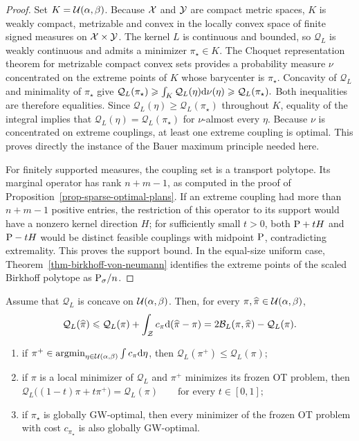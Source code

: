\begin{proof}
Set $K=\Couplings(\alpha,\beta)$. Because $\X$ and $\Y$ are compact metric spaces, $K$ is weakly compact, metrizable and convex in the locally convex space of finite signed measures on $\X\times\Y$. The kernel $L$ is continuous and bounded, so $\mathcal Q_L$ is weakly continuous and admits a minimizer $\pi_\star\in K$. The Choquet representation theorem for metrizable compact convex sets provides a probability measure $\nu$ concentrated on the extreme points of $K$ whose barycenter is $\pi_\star$. Concavity of $\mathcal Q_L$ and minimality of $\pi_\star$ give
\(\mathcal Q_L(\pi_\star) \geq \int_K\mathcal Q_L(\eta)\d\nu(\eta) \geq \mathcal Q_L(\pi_\star).\)
Both inequalities are therefore equalities. Since $\mathcal Q_L(\eta)\geq\mathcal Q_L(\pi_\star)$ throughout $K$, equality of the integral implies that $\mathcal Q_L(\eta)=\mathcal Q_L(\pi_\star)$ for $\nu$-almost every $\eta$. Because $\nu$ is concentrated on extreme couplings, at least one extreme coupling is optimal. This proves directly the instance of the Bauer maximum principle needed here.

For finitely supported measures, the coupling set is a transport polytope. Its marginal operator has rank $n+m-1$, as computed in the proof of Proposition~\ref{prop-sparse-optimal-plans}. If an extreme coupling had more than $n+m-1$ positive entries, the restriction of this operator to its support would have a nonzero kernel direction $H$; for sufficiently small $t>0$, both $\P+tH$ and $\P-tH$ would be distinct feasible couplings with midpoint $\P$, contradicting extremality. This proves the support bound. In the equal-size uniform case, Theorem~\ref{thm-birkhoff-von-neumann} identifies the extreme points of the scaled Birkhoff polytope as $\P_\sigma/n$.
\end{proof}
\begin{prop}\label{prop-gw-frozen-ot-replacement}
Assume that $\mathcal Q_L$ is concave on $\Couplings(\alpha,\beta)$. Then, for every $\pi,\widehat\pi\in\Couplings(\alpha,\beta)$,
\begin{equation}\label{eq-gw-tangent-majorization}
\mathcal Q_L(\widehat\pi)
\leq
\mathcal Q_L(\pi)
+
\int_{\mathcal Z}c_\pi\d(\widehat\pi-\pi)
=
2\mathcal B_L(\pi,\widehat\pi)-\mathcal Q_L(\pi).
\end{equation}
\begin{enumerate}
\item if $\pi^+\in\argmin_{\eta\in\Couplings(\alpha,\beta)}\int c_\pi\d\eta$, then $\mathcal Q_L(\pi^+)\leq\mathcal Q_L(\pi)$;
\item if $\pi$ is a local minimizer of $\mathcal Q_L$ and $\pi^+$ minimizes its frozen OT problem, then
\(\mathcal Q_L\bigl((1-t)\pi+t\pi^+\bigr) = \mathcal Q_L(\pi) \qquad\text{for every }t\in[0,1];\)
\item if $\pi_\star$ is globally GW-optimal, then every minimizer of the frozen OT problem with cost $c_{\pi_\star}$ is also globally GW-optimal.
\end{enumerate}
\end{prop}
